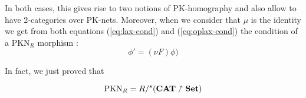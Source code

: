 In both cases, this gives rise to two notions of PK-homography and also allow to have 2-categories over PK-nets. Moreover, when we consider that $\mu$ is the identity we get from both equations (\ref{eq:lax-cond}) and (\ref{eq:oplax-cond}) the condition of a $\text{PKN}_R$ morphism : 
$$\phi' = (\nu F)\phi)$$

In fact, we just proved that
\begin{thm}
    $$\text{PKN}_R = R /^s (\bf CAT\nnearrow Set)$$
\end{thm}



